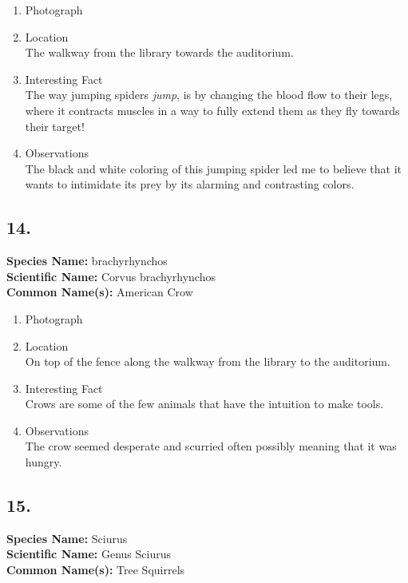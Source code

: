 \documentclass{article}
\begin{document}
\begin{enumerate}[label = \textbf{\arabic*)}]
	\item Photograph

	\item Location \\
		The walkway from the library towards the auditorium.
	\item Interesting Fact \\
		The way jumping spiders \textit{jump}, is by changing the blood flow to their legs, where it contracts muscles in a way to fully extend them as they fly towards their target!
	\item Observations \\
		The black and white coloring of this jumping spider led me to believe that it wants to intimidate its prey by its alarming and contrasting colors.
\end{enumerate}

\subsection{14.}
\textbf{Species Name: } brachyrhynchos \\
\textbf{Scientific Name: } Corvus brachyrhynchos \\
\textbf{Common Name(s): } American Crow

\begin{enumerate}[label = \textbf{\arabic*)}]
	\item Photograph

	\item Location \\
		On top of the fence along the walkway from the library to the auditorium.
	\item Interesting Fact \\
		Crows are some of the few animals that have the intuition to make tools.
	\item Observations \\
		The crow seemed desperate and scurried often possibly meaning that it was hungry.
\end{enumerate}

\subsection{15.}
\textbf{Species Name: } Sciurus \\
\textbf{Scientific Name: } Genus Sciurus \\
\textbf{Common Name(s): } Tree Squirrels
\end{document}
